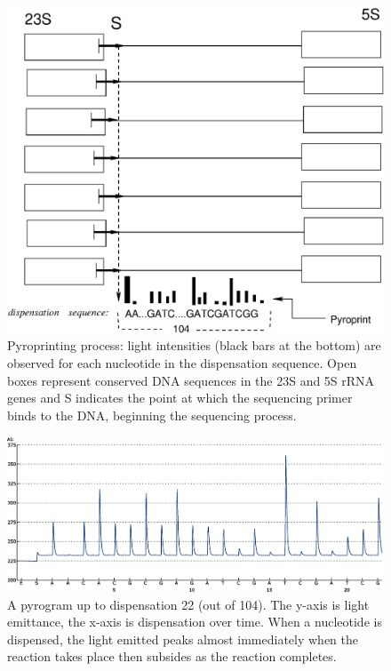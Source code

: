 \documentclass[12pt]{ucthesis}
\begin{document}
      \begin{figure}[t]
      \centering
      \includegraphics[width=\columnwidth]{graphics/pyroprinting.eps}
      \caption{Pyroprinting process: light intensities (black bars at the
               bottom) are observed for each nucleotide in the dispensation
               sequence. Open boxes represent conserved DNA sequences in the
               23S and 5S rRNA genes and \textnormal{S} indicates the point at
               which the sequencing primer binds to the DNA, beginning the
               sequencing process.}
      \label{fig:pyroprinting}
      \end{figure}

      \begin{figure}[t]
      \centering
      \includegraphics[width=\columnwidth]{graphics/pyrogram.eps}
      \caption{A pyrogram up to dispensation 22 (out of 104). The y-axis is
      light emittance, the x-axis is dispensation over time. When a nucleotide
      is dispensed, the light emitted peaks almost immediately when the
      reaction takes place then subsides as the reaction completes.}
      \label{fig:pyrogram}
      \end{figure}
\end{document}
